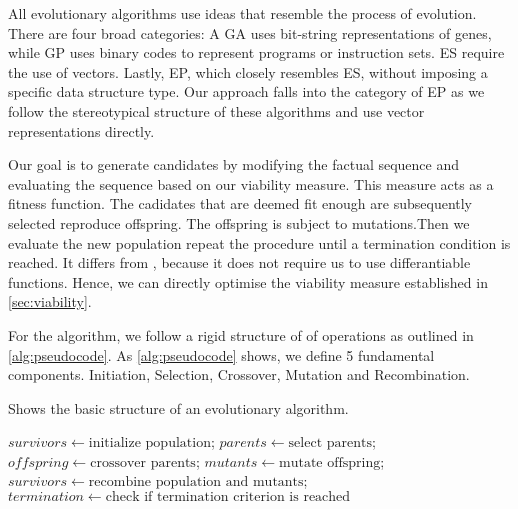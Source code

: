 \documentclass[./../../paper.tex]{subfiles}
\begin{document}





All evolutionary algorithms use ideas that resemble the process of evolution. There are four broad categories: A \gls{GA} uses bit-string representations of genes, while \gls{GP} uses binary codes to represent programs or instruction sets. \gls{ES} require the use of vectors. Lastly, \gls{EP}, which closely resembles \gls{ES}, without imposing a specific data structure type. Our approach falls into the category of \gls{EP} as we follow the stereotypical structure of these algorithms and use vector representations directly.

Our goal is to generate candidates by modifying the factual sequence and evaluating the sequence based on our viability measure. This measure acts as a fitness function. The cadidates that are deemed fit enough are subsequently selected reproduce offspring. The offspring is subject to mutations.Then we evaluate the new population repeat the procedure until a termination condition is reached. It differs from , because it does not require us to use differantiable functions. Hence, we can directly optimise the viability measure established in \autoref{sec:viability}.

For the algorithm, we follow a rigid structure of of operations as outlined in \autoref{alg:pseudocode}. As \autoref{alg:pseudocode} shows, we define 5 fundamental components. Initiation, Selection, Crossover, Mutation and Recombination.

\begin{algorithm}[htb!]
    \label{alg:evolutionary}
    \caption{Shows the basic structure of an evolutionary algorithm.} 
    \begin{algorithmic}
        \State $survivors \gets \text{initialize population}$;
        \State $parents \gets \text{select parents}$;
        \State $offspring \gets \text{crossover parents}$;
        \State $mutants \gets \text{mutate offspring}$;
        \State $survivors \gets \text{recombine population and mutants}$;
        \State $termination \gets \text{check if termination criterion is reached}$
        \EndWhile
    \end{algorithmic}
\end{algorithm}
\end{document}
